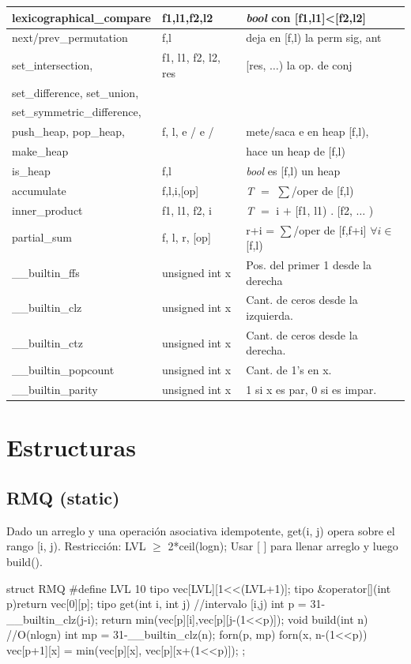 \documentclass[10pt,landscape,twocolumn,a4paper,notitlepage]{article}
\begin{document}
\begin{tabular}{|l|l|p{5.4cm}|}
lexicographical\_compare & f1,l1,f2,l2 & \textit{bool} con [f1,l1]<[f2,l2]\\\hline
next/prev\_permutation & f,l & deja en [f,l) la perm sig, ant\\\hline
set\_intersection, & f1, l1, f2, l2, res & [res, $\ldots$) la op. de conj\\
set\_difference, set\_union, & & \\
set\_symmetric\_difference, & &\\\hline
push\_heap, pop\_heap, & f, l, e / e / & mete/saca e en heap [f,l), \\
make\_heap & & hace un heap de [f,l)\\\hline
is\_heap & f,l & \textit{bool} es [f,l) un heap\\\hline
accumulate & f,l,i,[op] & \textit{T} $=$ $\sum$/oper de [f,l)\\\hline
inner\_product & f1, l1, f2, i & \textit{T} $=$ i $+$ [f1, l1) . [f2, $\ldots$ )\\\hline
partial\_sum & f, l, r, [op] & r+i = $\sum$/oper de [f,f+i] $\forall i \in$[f,l)\\\hline
\_\_builtin\_ffs& unsigned int x & Pos. del primer 1 desde la derecha\\\hline
\_\_builtin\_clz & unsigned int x & Cant. de ceros desde la izquierda.\\\hline
\_\_builtin\_ctz & unsigned int x & Cant. de ceros desde la derecha.\\\hline
\_\_builtin\_popcount & unsigned int x & Cant. de 1’s en x.\\\hline
\_\_builtin\_parity & unsigned int x & 1 si x es par, 0 si es impar.\\\hline
\end{tabular}


\section{Estructuras}
\subsection{RMQ (static)}
Dado un arreglo y una operación asociativa idempotente, get(i, j) opera sobre el rango [i, j). Restricción: LVL $\ge$ 2*ceil(logn); Usar [ ] para llenar arreglo y luego build().
\begin{code}
struct RMQ{
	#define LVL 10
	tipo vec[LVL][1<<(LVL+1)];
	tipo &operator[](int p){return vec[0][p];}
	tipo get(int i, int j) {//intervalo [i,j)
		int p = 31-__builtin_clz(j-i);
		return min(vec[p][i],vec[p][j-(1<<p)]);
	}
	void build(int n) {//O(nlogn)
		int mp = 31-__builtin_clz(n);
		forn(p, mp) forn(x, n-(1<<p))
			vec[p+1][x] = min(vec[p][x], vec[p][x+(1<<p)]);
	}
};
\end{code}
\end{document}
